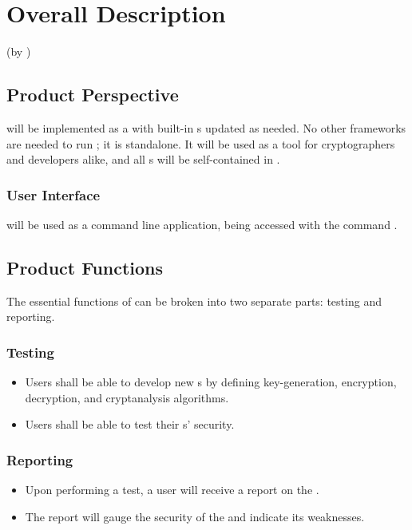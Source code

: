 \section{Overall Description}
(by \dd)


\subsection{Product Perspective}

\cry{} will be implemented as a \cf{} with built-in \cs s
updated as needed. No other frameworks are needed to run
\cry; it is standalone. It will be used as a
tool for cryptographers and developers alike, and all \cs s
will be self-contained in \cry.

\subsubsection{User Interface}
\cry{} will be used as a command line application, being
accessed with the command .


\subsection{Product Functions}

The essential functions of \cry{} can be broken into two
separate parts: testing and reporting.

\subsubsection{Testing}
\begin{itemize}
\item Users shall be able to develop new \cs s{}
  by defining key-generation, encryption, decryption,
  and cryptanalysis algorithms.
\item Users shall be able to test their \cs s' security.
\end{itemize}

\subsubsection{Reporting}
\begin{itemize}
\item Upon performing a test, a user will receive a report on
  the \cs.
\item The report will gauge the security of the
  \cs{} and indicate its weaknesses.
\end{itemize}

